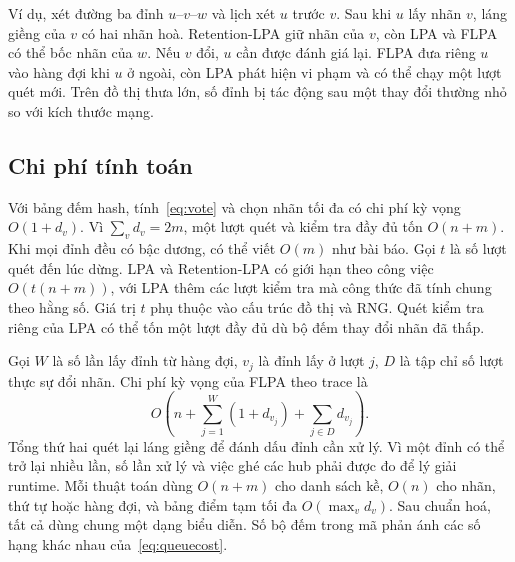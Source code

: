 Ví dụ, xét đường ba đỉnh $u$–$v$–$w$ và lịch xét $u$ trước $v$. Sau khi $u$ lấy nhãn $v$, láng giềng của $v$ có hai nhãn hoà. Retention-LPA giữ nhãn của $v$, còn LPA và FLPA có thể bốc nhãn của $w$. Nếu $v$ đổi, $u$ cần được đánh giá lại. FLPA đưa riêng $u$ vào hàng đợi khi $u$ ở ngoài, còn LPA phát hiện vi phạm và có thể chạy một lượt quét mới. Trên đồ thị thưa lớn, số đỉnh bị tác động sau một thay đổi thường nhỏ so với kích thước mạng.

\subsection{Chi phí tính toán}
Với bảng đếm hash, tính~\eqref{eq:vote} và chọn nhãn tối đa có chi phí kỳ vọng $O(1+d_v)$. Vì $\sum_v d_v=2m$, một lượt quét và kiểm tra đầy đủ tốn $O(n+m)$. Khi mọi đỉnh đều có bậc dương, có thể viết $O(m)$ như bài báo. Gọi $t$ là số lượt quét đến lúc dừng. LPA và Retention-LPA có giới hạn theo công việc $O(t(n+m))$, với LPA thêm các lượt kiểm tra mà công thức đã tính chung theo hằng số. Giá trị $t$ phụ thuộc vào cấu trúc đồ thị và RNG. Quét kiểm tra riêng của LPA có thể tốn một lượt đầy đủ dù bộ đếm thay đổi nhãn đã thấp.

Gọi $W$ là số lần lấy đỉnh từ hàng đợi, $v_j$ là đỉnh lấy ở lượt $j$, $D$ là tập chỉ số lượt thực sự đổi nhãn. Chi phí kỳ vọng của FLPA theo trace là
\begin{equation}
 O\!\left(n+\sum_{j=1}^{W}(1+d_{v_j})+\sum_{j\in D}d_{v_j}\right).
 \label{eq:queuecost}
\end{equation}
Tổng thứ hai quét lại láng giềng để đánh dấu đỉnh cần xử lý. Vì một đỉnh có thể trở lại nhiều lần, số lần xử lý và việc ghé các hub phải được đo để lý giải runtime. Mỗi thuật toán dùng $O(n+m)$ cho danh sách kề, $O(n)$ cho nhãn, thứ tự hoặc hàng đợi, và bảng điểm tạm tối đa $O(\max_v d_v)$. Sau chuẩn hoá, tất cả dùng chung một dạng biểu diễn. Số bộ đếm trong mã phản ánh các số hạng khác nhau của~\eqref{eq:queuecost}.
